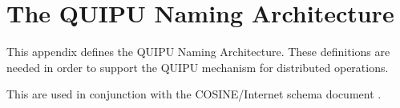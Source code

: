 
\chapter {The QUIPU Naming Architecture}\label{naming}

This appendix defines the QUIPU Naming Architecture.
These definitions are needed in order to support
the QUIPU mechanism for distributed operations.

This are used in conjunction with the COSINE/Internet schema document
\cite{Cosine.NA}.

